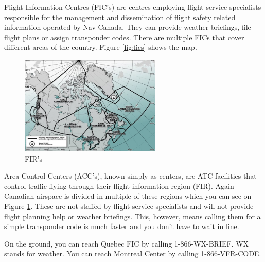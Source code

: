 \documentclass[12pt,letterpaper]{article}
\begin{document}
        Flight Information Centres (FIC's) are centres employing flight service specialists responsible for the management and dissemination of flight safety related information operated by Nav Canada. They can provide weather briefings, file flight plans or assign transponder codes. There are multiple FICs that cover different areas of the country. Figure \ref{fig:fics} shows the map.
        
        \begin{figure}[h]
          \begin{center}
            \includegraphics[width=0.6\textwidth]{firs.jpg}
          \end{center}
          \caption{FIR's}
          \label{fig:firs}
        \end{figure}

        Area Control Centers (ACC's), known simply as centers, are ATC facilities that control traffic flying through their flight information region (FIR). Again Canadian airspace is divided in multiple of these regions which you can see on Figure \ref{fig:firs}. These are not staffed by flight service specialists and will not provide flight planning help or weather briefings. This, however, means calling them for a simple transponder code is much faster and you don't have to wait in line.
        
        On the ground, you can reach Quebec FIC by calling 1-866-WX-BRIEF. WX stands for weather. You can reach Montreal Center by calling 1-866-VFR-CODE.

    \clearpage
\end{document}
